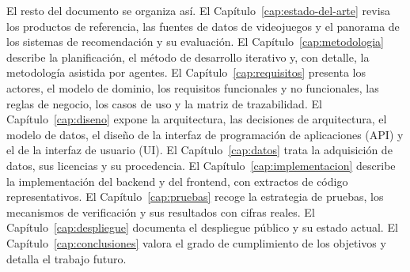 El resto del documento se organiza así. El Capítulo~\ref{cap:estado-del-arte} revisa los
productos de referencia, las fuentes de datos de videojuegos y el panorama de los sistemas de
recomendación y su evaluación. El Capítulo~\ref{cap:metodologia} describe la planificación,
el método de desarrollo iterativo y, con detalle, la metodología asistida por agentes. El
Capítulo~\ref{cap:requisitos} presenta los actores, el modelo de dominio, los requisitos
funcionales y no funcionales, las reglas de negocio, los casos de uso y la matriz de
trazabilidad. El Capítulo~\ref{cap:diseno} expone la arquitectura, las decisiones de
arquitectura, el modelo de datos, el diseño de la interfaz de programación de aplicaciones
(API) y el de la interfaz de usuario (UI). El Capítulo~\ref{cap:datos} trata la adquisición
de datos, sus licencias y su procedencia. El Capítulo~\ref{cap:implementacion} describe la
implementación del backend y del frontend, con extractos de código representativos. El
Capítulo~\ref{cap:pruebas} recoge la estrategia de pruebas, los mecanismos de verificación y
sus resultados con cifras reales. El Capítulo~\ref{cap:despliegue} documenta el despliegue
público y su estado actual. El Capítulo~\ref{cap:conclusiones} valora el grado de
cumplimiento de los objetivos y detalla el trabajo futuro.
